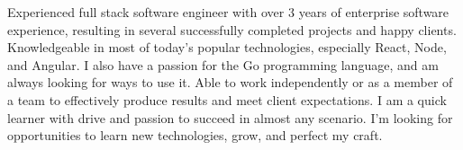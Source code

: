 

\begin{cvparagraph}

Experienced full stack software engineer with over 3 years of enterprise software experience, resulting in several successfully completed projects and happy clients. Knowledgeable in most of today's popular technologies, especially React, Node, and Angular. I also have a passion for the Go programming language, and am always looking for ways to use it. Able to work independently or as a member of a team to effectively produce results and meet client expectations. I am a quick learner with drive and passion to succeed in almost any scenario. I’m looking for opportunities to learn new technologies, grow, and perfect my craft.
\end{cvparagraph}
